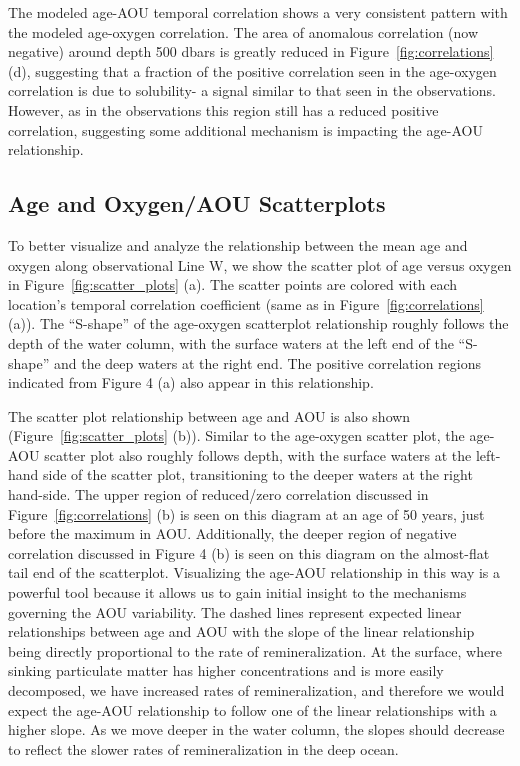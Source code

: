 The modeled age-AOU temporal correlation shows a very consistent pattern with the
modeled age-oxygen correlation. The area of anomalous correlation (now negative)
around depth 500 dbars is greatly reduced in Figure~\ref{fig:correlations} (d),
suggesting that a fraction of the positive correlation seen in the age-oxygen
correlation is due to solubility- a signal similar to that seen in the observations.
However, as in the observations this region still has a reduced positive correlation,
suggesting some additional mechanism is impacting the age-AOU relationship.

\subsection{Age and Oxygen/AOU Scatterplots}

To better visualize and analyze the relationship between the mean age and oxygen
along observational Line W, we show the scatter plot of age versus oxygen in
Figure~\ref{fig:scatter_plots} (a). The scatter points are colored with each
location's temporal correlation coefficient (same as in Figure~\ref{fig:correlations}
(a)). The ``S-shape'' of the age-oxygen scatterplot relationship roughly follows
the depth of the water column, with the surface waters at the left end of the
``S-shape'' and the deep waters at the right end. The positive correlation regions
indicated from Figure 4 (a) also appear in this relationship.

The scatter plot relationship between age and AOU is also shown
(Figure~\ref{fig:scatter_plots} (b)).  Similar to the age-oxygen scatter plot,
the age-AOU scatter plot also roughly follows depth, with the surface waters at
the left-hand side of the scatter plot, transitioning to the deeper waters at
the right hand-side. The upper region of reduced/zero correlation discussed in
Figure~\ref{fig:correlations} (b) is seen on this diagram at an age of 50 years,
just before the maximum in AOU. Additionally, the deeper region of negative
correlation discussed in Figure 4 (b) is seen on this diagram on the almost-flat
tail end of the scatterplot. Visualizing the age-AOU relationship in this way is
a powerful tool because it allows us to gain initial insight to the mechanisms
governing the AOU variability. The dashed lines represent expected linear
relationships between age and AOU with the slope of the linear relationship being
directly proportional to the rate of remineralization. At the surface, where
sinking particulate matter has higher concentrations and is more easily decomposed,
we have increased rates of remineralization, and therefore we would expect the
age-AOU relationship to follow one of the linear relationships with a higher slope.
As we move deeper in the water column, the slopes should decrease to reflect the
slower rates of remineralization in the deep ocean.

